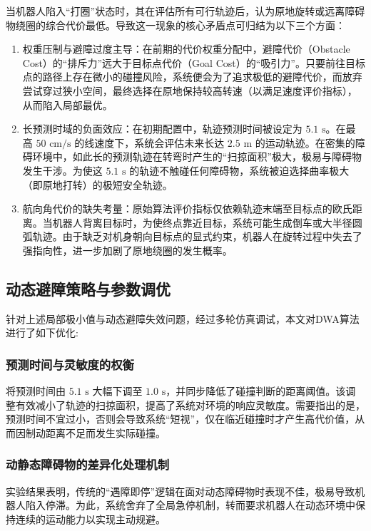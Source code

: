 当机器人陷入“打圈”状态时，其在评估所有可行轨迹后，认为原地旋转或远离障碍物绕圈的综合代价最低。导致这一现象的核心矛盾点可归结为以下三个方面：

\begin{enumerate}
    \item 权重压制与避障过度主导：在前期的代价权重分配中，避障代价（Obstacle Cost）的“排斥力”远大于目标点代价（Goal Cost）的“吸引力”。只要前往目标点的路径上存在微小的碰撞风险，系统便会为了追求极低的避障代价，而放弃尝试穿过狭小空间，最终选择在原地保持较高转速（以满足速度评价指标），从而陷入局部最优。
    
    \item 长预测时域的负面效应：在初期配置中，轨迹预测时间被设定为 $5.1\text{ s}$。在最高 $50\text{ cm/s}$ 的线速度下，系统会评估未来长达 $2.5\text{ m}$ 的运动轨迹。在密集的障碍环境中，如此长的预测轨迹在转弯时产生的“扫掠面积”极大，极易与障碍物发生干涉。为使这 $5.1\text{ s}$ 的轨迹不触碰任何障碍物，系统被迫选择曲率极大（即原地打转）的极短安全轨迹。
    
    \item 航向角代价的缺失考量：原始算法评价指标仅依赖轨迹末端至目标点的欧氏距离。当机器人背离目标时，为使终点靠近目标，系统可能生成倒车或大半径圆弧轨迹。由于缺乏对机身朝向目标点的显式约束，机器人在旋转过程中失去了强指向性，进一步加剧了原地绕圈的发生概率。
\end{enumerate}

\subsection{动态避障策略与参数调优}

针对上述局部极小值与动态避障失效问题，经过多轮仿真调试，本文对DWA算法进行了如下优化:

\subsubsection{预测时间与灵敏度的权衡}
将预测时间由 $5.1\text{ s}$ 大幅下调至 $1.0\text{ s}$，并同步降低了碰撞判断的距离阈值。该调整有效减小了轨迹的扫掠面积，提高了系统对环境的响应灵敏度。需要指出的是，预测时间不宜过小，否则会导致系统“短视”，仅在临近碰撞时才产生高代价值，从而因制动距离不足而发生实际碰撞。

\subsubsection{动静态障碍物的差异化处理机制}
实验结果表明，传统的“遇障即停”逻辑在面对动态障碍物时表现不佳，极易导致机器人陷入停滞。为此，系统舍弃了全局急停机制，转而要求机器人在动态环境中保持连续的运动能力以实现主动规避。

